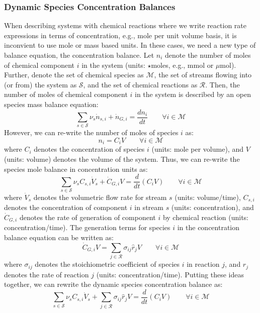 \documentclass{article}[12pt]
\begin{document}
\subsubsection*{Dynamic Species Concentration Balances}
When describing systems with chemical reactions where we write reaction rate expressions in terms of 
concentration, e.g., mole per unit volume basis, it is inconvient to use mole or mass based units.
In these cases, we need a new type of balance equation, the concentration balance. 
Let $n_{i}$ denote the number of moles of chemical component $i$ in the system (units: $\star$moles, e.g., mmol or  $\mu$mol). 
Further, denote the set of chemical species as $\mathcal{M}$, the set of streams flowing into (or from) the system as $\mathcal{S}$, and the set of chemical reactions as $\mathcal{R}$.
Then, the number of moles of chemical component $i$ in the system is described by an open species mass balance equation:
\begin{equation}
\sum_{s\in\mathcal{S}}\nu_{s}\dot{n}_{s,i} + \dot{n}_{G,i} = \frac{dn_{i}}{dt}
\qquad\forall{i}\in\mathcal{M}
\end{equation}
However, we can re-write the number of moles of species $i$ as:
\begin{equation}
n_{i} = C_{i}V\qquad\forall{i}\in\mathcal{M}
\end{equation}
where $C_{i}$ denotes the concentration of species $i$ (units: mole per volume), and $V$ (units: volume) denotes the volume of the system. 
Thus, we can re-write the species mole balance in concentration units as:
\begin{equation}\label{eqn:concentration-balance}
\sum_{s\in\mathcal{S}}\nu_{s}C_{s,i}\dot{V}_{s} + \dot{C}_{G,i}V = \frac{d}{dt}\left(C_{i}V\right)\qquad\forall{i}\in\mathcal{M}
\end{equation}
where $\dot{V}_{s}$ denotes the volumetric flow rate for stream $s$ (units: volume/time), 
$C_{s,i}$ denotes the concentration of component $i$ in stream $s$ (units: concentration), 
and $\dot{C}_{G,i}$ denotes the rate of generation of component $i$ by chemical reaction (units: concentration/time).
The generation terms for species $i$ in the concentration balance equation can be written as:
\begin{equation}\label{eqn:concentration-gen-terms}
\dot{C}_{G,i}V = \sum_{j\in\mathcal{R}}\sigma_{ij}\hat{r}_{j}V\qquad\forall{i}\in\mathcal{M}
\end{equation}
where $\sigma_{ij}$ denotes the stoichiometric coefficient of species $i$ in reaction $j$, 
and $\hat{r}_{j}$ denotes the rate of reaction $j$ (units: concentration/time).
Putting these ideas together, we can rewrite the dynamic species concentration balance as:
\begin{equation}\label{eqn:concentration-balance-with-extent}
\sum_{s\in\mathcal{S}}\nu_{s}C_{s,i}\dot{V}_{s} + \sum_{j\in\mathcal{R}}\sigma_{ij}\hat{r}_{j}V = \frac{d}{dt}\left(C_{i}V\right)\qquad\forall{i\in\mathcal{M}}
\end{equation}
\end{document}
